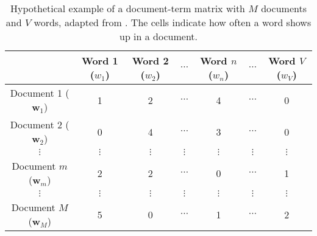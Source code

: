 \begin{table}[]
	\centering
	\begin{tabular}{c|cccccc}
           		        & Word 1 ($w_{1}$) & Word 2 ($w_{2}$) & $\cdots$ & Word $n$ ($w_{n}$) & $\cdots$ & Word $V$ ($w_{V}$) \\ \hline
Document 1 ($\mathbf{w}_{1}$) & 1 & 2 & $\cdots$ & 4 & $\cdots$ & 0 \\
Document 2 ($\mathbf{w}_{2}$) & 0 & 4 & $\cdots$ & 3 & $\cdots$ & 0 \\
$\vdots$ & $\vdots$ & $\vdots$ & $\vdots$ & $\vdots$ & $\vdots$ & $\vdots$ \\
Document $m$ ($\mathbf{w}_{m}$) & 2 & 2 & $\cdots$ & 0 & $\cdots$ & 1 \\
$\vdots$ & $\vdots$ & $\vdots$ & $\vdots$ & $\vdots$ & $\vdots$ & $\vdots$ \\
Document $M$ ($\mathbf{w}_{M}$) & 5 & 0 & $\cdots$ & 1 & $\cdots$ & 2
	\end{tabular}
	\caption{Hypothetical example of a document-term matrix with $M$ documents and $V$ words, adapted from \cite{ponweiser_latent_2012}. The cells indicate how often a word shows up in a document.}
	\label{tab:dtm}
\end{table}

